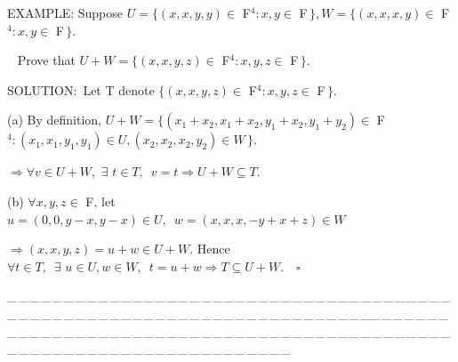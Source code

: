 \documentclass[a4paper, 11pt, UTF8]{article}
\begin{document}
\begin{large}
{\timesbf\Large E{\small XAMPLE}}: {\timessl\Large 
Suppose $U=\{(x,x,y,y)\in$ {\timesbf F}$^4:x,y\in$ {\timesbf F}$\,\},W=\{(x,x,x,y)\in$ {\timesbf F}$^4:x,y\in$ {\timesbf F}$\,\}.$
}\par\qquad\qquad\,\,\,
{\timessl\Large Prove that $U+W=\{(x,x,y,z)\in$ {\timesbf F}$^4:x,y,z\in$ {\timesbf F}$\,\}$.}\par
{\timesbf S\footnotesize{OLUTION:}}\,\,\,Let T denote $\{(x,x,y,z)\in$ {\timesbf F}$^4:x,y,z\in$ {\timesbf F}$\,\}$.\par\quad
(a) By definition, $U+W=\{(x_1+x_2,x_1+x_2,y_1+x_2,y_1+y_2)\in$ {\timesbf F}$^4:(x_1,x_1,y_1,y_1)\in U,(x_2,x_2,x_2,y_2)\in W\,\}$.\par\qquad
$\Rightarrow\forall v\in U+W,\,\,\exists\,\,t\in T,\,\,\,v=t\Rightarrow U+W\subseteq T$.\par\quad
(b) $\forall x,y,z\in$ {\timesbf F}, let $u=(0,0,y-x,y-x)\in U,\,\,\,w=(x,x,x,-y+x+z)\in W$\par\qquad
$\Rightarrow (x,x,y,z)=u+w\in U+W$. Hence $\forall t\in T,\,\,\,\exists\,\,u\in U,w\in W,\,\,\,t=u+w\Rightarrow T\subseteq U+W.\,\,\,\,\,\,\square$\par
{\tiny \_\,\_\,\_\,\_\,\_\,\_\,\_\,\_\,\_\,\_\,\_\,\_\,\_\,\_\,\_\,\_\,\_\,\_\,\_\,\_\,\_\,\_\,\_\,\_\,\_\,\_\,\_\,\_\,\_\,\_\,\_\,\_\,\_\,\_\,\_\,\_\,\_\,\_\,\_\,\_\,\_\,\_\,\_\,\_\,\_\,\_\,\_\,\_\,\_\,\_\,\_\,\_\,\_\,\_\,\_\,\_\,\_\,\_\,\_\,\_\,\_\,\_\,\_\,\_\,\_\,\_\,\_\,\_\,\_\,\_\,\_\_\,\_\,\_\,\_\,\_\,\_\,\_\,\_\,\_\,\_\,\_\,\_\,\_\,\_\,\_\,\_\,\_\,\_\,\_\,\_\,\_\,\_\,\_\,\_\,\_\,\_\,\_\,\_\,\_\,\_\,\_\,\_\,\_\,\_\,\_\,\_\,\_\,\_\,\_\,\_\,\_\,\_\,\_\,\_\,\_\,\_\,\_\,\_\,\_\,\_\,\_\,\_\,\_\,\_\,\_\,\_\,\_\,\_\,\_\,\_\,\_\,\_\,\_\,\_\,\_\,\_\,\_\,\_\,\_\,\_\,\_}\par


\end{large}
\end{document}
